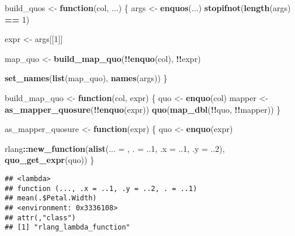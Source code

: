 \documentclass[]{book}
\newenvironment{Shaded}{\begin{snugshade}}{\end{snugshade}}
\newcommand{\ControlFlowTok}[1]{\textcolor[rgb]{0.13,0.29,0.53}{\textbf{#1}}}
\newcommand{\DataTypeTok}[1]{\textcolor[rgb]{0.13,0.29,0.53}{#1}}
\newcommand{\DecValTok}[1]{\textcolor[rgb]{0.00,0.00,0.81}{#1}}
\newcommand{\KeywordTok}[1]{\textcolor[rgb]{0.13,0.29,0.53}{\textbf{#1}}}
\newcommand{\NormalTok}[1]{#1}
\newcommand{\OperatorTok}[1]{\textcolor[rgb]{0.81,0.36,0.00}{\textbf{#1}}}
\newcommand{\StringTok}[1]{\textcolor[rgb]{0.31,0.60,0.02}{#1}}
\begin{document}
\begin{Shaded}
\begin{Highlighting}[]
\NormalTok{build_quos <-}\StringTok{ }\ControlFlowTok{function}\NormalTok{(col, ...) \{}
\NormalTok{  args <-}\StringTok{ }\KeywordTok{enquos}\NormalTok{(...)}
  \KeywordTok{stopifnot}\NormalTok{(}\KeywordTok{length}\NormalTok{(args) }\OperatorTok{==}\StringTok{ }\DecValTok{1}\NormalTok{)}

\NormalTok{  expr <-}\StringTok{ }\NormalTok{args[[}\DecValTok{1}\NormalTok{]]}

\NormalTok{  map_quo <-}\StringTok{ }\KeywordTok{build_map_quo}\NormalTok{(}\OperatorTok{!!}\KeywordTok{enquo}\NormalTok{(col), }\OperatorTok{!!}\NormalTok{expr)}

  \KeywordTok{set_names}\NormalTok{(}\KeywordTok{list}\NormalTok{(map_quo), }\KeywordTok{names}\NormalTok{(args))}
\NormalTok{\}}

\NormalTok{build_map_quo <-}\StringTok{ }\ControlFlowTok{function}\NormalTok{(col, expr) \{}
\NormalTok{  quo <-}\StringTok{ }\KeywordTok{enquo}\NormalTok{(col)}
\NormalTok{  mapper <-}\StringTok{ }\KeywordTok{as_mapper_quosure}\NormalTok{(}\OperatorTok{!!}\KeywordTok{enquo}\NormalTok{(expr))}
  \KeywordTok{quo}\NormalTok{(}\KeywordTok{map_dbl}\NormalTok{(}\OperatorTok{!!}\NormalTok{quo, }\OperatorTok{!!}\NormalTok{mapper))}
\NormalTok{\}}

\NormalTok{as_mapper_quosure <-}\StringTok{ }\ControlFlowTok{function}\NormalTok{(expr) \{}
\NormalTok{  quo <-}\StringTok{ }\KeywordTok{enquo}\NormalTok{(expr)}

\NormalTok{  rlang}\OperatorTok{::}\KeywordTok{new_function}\NormalTok{(}\KeywordTok{alist}\NormalTok{(}\DataTypeTok{... =}\NormalTok{ , }\DataTypeTok{. =}\NormalTok{ ..}\DecValTok{1}\NormalTok{, }\DataTypeTok{.x =}\NormalTok{ ..}\DecValTok{1}\NormalTok{, }\DataTypeTok{.y =}\NormalTok{ ..}\DecValTok{2}\NormalTok{), }\KeywordTok{quo_get_expr}\NormalTok{(quo))}
\NormalTok{\}}
\end{Highlighting}
\end{Shaded}

\begin{Shaded}
\end{Shaded}

\begin{verbatim}
## <lambda>
## function (..., .x = ..1, .y = ..2, . = ..1) 
## mean(.$Petal.Width)
## <environment: 0x3336108>
## attr(,"class")
## [1] "rlang_lambda_function"
\end{verbatim}
\end{document}
